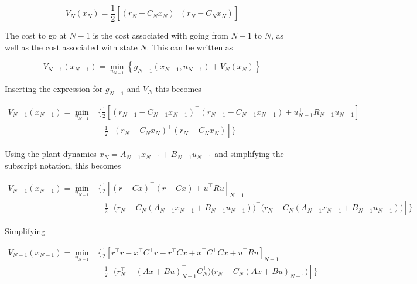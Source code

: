 \documentclass[11pt,letterpaper,onecolumn,notitlepage]{article}
\begin{document}
\begin{equation*}
  V_{N}(x_{N})=\frac{1}{2}\left[(r_{N}-C_{N}x_{N})^{\top}(r_{N}-C_{N}x_{N})\right]
\end{equation*}

The cost to go at $N-1$ is the cost associated with going from $N-1$ to $N$, as well as the cost associated with state $N$.
This can be written as

\begin{equation*}
  V_{N-1}(x_{N-1})=\min_{u_{N-1}}\left\{g_{N-1}(x_{N-1},u_{N-1})+V_{N}(x_{N})\right\}
\end{equation*}

Inserting the expression for $g_{N-1}$ and $V_{N}$ this becomes

\begin{equation*}
  \begin{split}
    V_{N-1}(x_{N-1})=\min_{u_{N-1}}&\biggr\{\frac{1}{2}\left[(r_{N-1}-C_{N-1}x_{N-1})^{\top}(r_{N-1}-C_{N-1}x_{N-1})+u_{N-1}^{\top}R_{N-1}u_{N-1}\right] \\
    &+\frac{1}{2}\left[(r_{N}-C_{N}x_{N})^{\top}(r_{N}-C_{N}x_{N})\right]\biggr\}
  \end{split}
\end{equation*}

Using the plant dynamics $x_{N}=A_{N-1}x_{N-1}+B_{N-1}u_{N-1}$ and simplifying the subscript notation, this becomes

\begin{equation*}
  \begin{split}
    V_{N-1}(x_{N-1})=\min_{u_{N-1}}&\biggr\{\frac{1}{2}\left[(r-Cx)^{\top}(r-Cx)+u^{\top}Ru\right]_{N-1} \\
    &+\frac{1}{2}\left[\bigr(r_{N}-C_{N}(A_{N-1}x_{N-1}+B_{N-1}u_{N-1})\bigr)^{\top}\bigr(r_{N}-C_{N}(A_{N-1}x_{N-1}+B_{N-1}u_{N-1})\bigr)\right]\biggr\}
  \end{split}
\end{equation*}

Simplifying

\begin{equation*}
  \begin{split}
    V_{N-1}(x_{N-1})=\min_{u_{N-1}}&\biggr\{\frac{1}{2}\left[r^{\top}r-x^{\top}C^{\top}r-r^{\top}Cx+x^{\top}C^{\top}Cx+u^{\top}Ru\right]_{N-1} \\
    &+\frac{1}{2}\left[\bigr(r_{N}^{\top}-(Ax+Bu)_{N-1}^{\top}C_{N}^{\top}\bigr)\bigr(r_{N}-C_{N}(Ax+Bu)_{N-1}\bigr)\right]\biggr\}
  \end{split}
\end{equation*}
\end{document}

